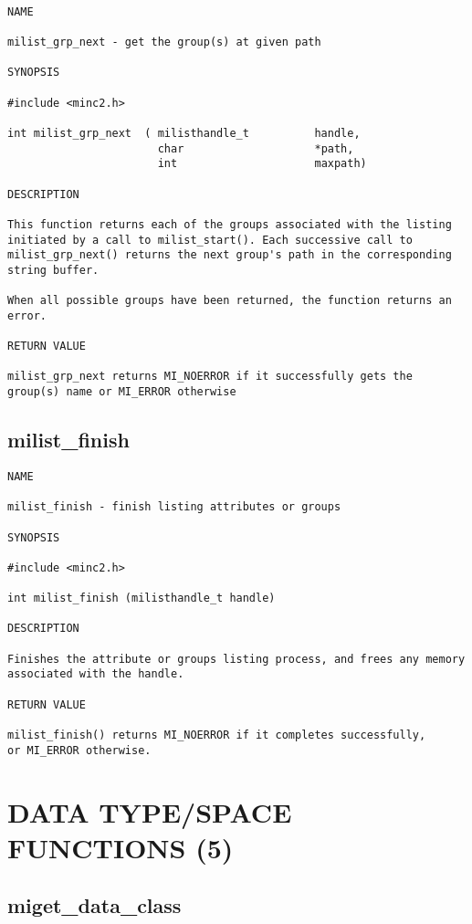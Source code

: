 \documentclass{article}
\begin{document}
\begin{verbatim}

NAME 

milist_grp_next - get the group(s) at given path

SYNOPSIS

#include <minc2.h>

int milist_grp_next  ( milisthandle_t          handle, 
                       char                    *path,
                       int                     maxpath)
                        
DESCRIPTION

This function returns each of the groups associated with the listing 
initiated by a call to milist_start(). Each successive call to 
milist_grp_next() returns the next group's path in the corresponding 
string buffer.

When all possible groups have been returned, the function returns an error.

RETURN VALUE

milist_grp_next returns MI_NOERROR if it successfully gets the
group(s) name or MI_ERROR otherwise

\end{verbatim}

\subsection{milist\_finish}

\begin{verbatim}
NAME

milist_finish - finish listing attributes or groups

SYNOPSIS

#include <minc2.h>

int milist_finish (milisthandle_t handle)

DESCRIPTION

Finishes the attribute or groups listing process, and frees any memory
associated with the handle.

RETURN VALUE 

milist_finish() returns MI_NOERROR if it completes successfully,
or MI_ERROR otherwise.

\end{verbatim}

\section{DATA TYPE/SPACE FUNCTIONS (5)}
\subsection{miget\_data\_class}
\end{document}
